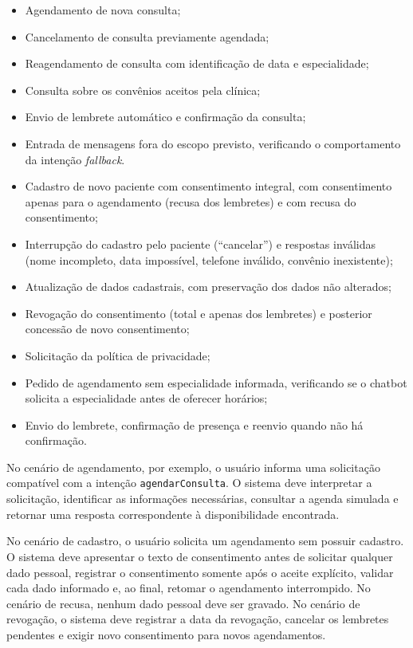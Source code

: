 \documentclass[12pt,a4paper]{extarticle}
\begin{document}
\begin{itemize}
    \item Agendamento de nova consulta;
    \item Cancelamento de consulta previamente agendada;
    \item Reagendamento de consulta com identificação de data e especialidade;
    \item Consulta sobre os convênios aceitos pela clínica;
    \item Envio de lembrete automático e confirmação da consulta;
    \item Entrada de mensagens fora do escopo previsto, verificando o comportamento da intenção \textit{fallback}.
    \item Cadastro de novo paciente com consentimento integral, com consentimento apenas para o agendamento (recusa dos lembretes) e com recusa do consentimento;
    \item Interrupção do cadastro pelo paciente (``cancelar'') e respostas inválidas (nome incompleto, data impossível, telefone inválido, convênio inexistente);
    \item Atualização de dados cadastrais, com preservação dos dados não alterados;
    \item Revogação do consentimento (total e apenas dos lembretes) e posterior concessão de novo consentimento;
    \item Solicitação da política de privacidade;
    \item Pedido de agendamento sem especialidade informada, verificando se o chatbot solicita a especialidade antes de oferecer horários;
    \item Envio do lembrete, confirmação de presença e reenvio quando não há confirmação.
\end{itemize}

No cenário de agendamento, por exemplo, o usuário informa uma solicitação compatível com a intenção \texttt{agendarConsulta}. O sistema deve interpretar a solicitação, identificar as informações necessárias, consultar a agenda simulada e retornar uma resposta correspondente à disponibilidade encontrada.

No cenário de cadastro, o usuário solicita um agendamento sem possuir cadastro. O sistema deve apresentar o texto de consentimento antes de solicitar qualquer dado pessoal, registrar o consentimento somente após o aceite explícito, validar cada dado informado e, ao final, retomar o agendamento interrompido. No cenário de recusa, nenhum dado pessoal deve ser gravado. No cenário de revogação, o sistema deve registrar a data da revogação, cancelar os lembretes pendentes e exigir novo consentimento para novos agendamentos.
\end{document}
